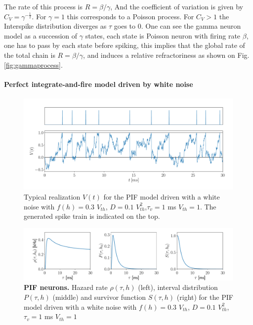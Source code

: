 \documentclass[12pt,twoside]{report}
\begin{document}
The rate of this process is $R=\beta/\gamma$, And the coefficient of variation is given by $C_V=\gamma^{-\frac{1}{2}}$. For $\gamma=1$ this corresponds to a Poisson process. For $C_V>1$ the Interspike distribution diverges as $\tau$ goes to $0$.  One can see the gamma  neuron model as a succession of $\gamma$ states, each state is Poisson neuron with firing rate $\beta$, one has to pass by each state before spiking, this implies that the global rate of the total chain is $R=\beta/\gamma$, and induces a relative refractoriness as shown on Fig.\ref{fig:gammaprocess}.


\paragraph{Perfect integrate-and-fire model driven by white noise}
\label{sec:pif}

\begin{figure}[h!]
	\centering
	\includegraphics[width=0.8\linewidth]{PIF_V}
	\caption{Typical realization $V(t)$ for the PIF model driven with a white noise with $f(h)=0.3$ $V_{th}$, $D=0.1$ $V_{th}^2$,$\tau_v=1$ ms $V_{th}=1$. The generated spike train is indicated on the top.
	}
	\label{fig:PIFV}
\end{figure}


\begin{figure}[h!]
	
	\includegraphics[width=\linewidth]{inversegaussian.pdf}
	\caption{\textbf{PIF neurons.} Hazard rate $\rho(\tau,h)$ (left), interval distribution $P(\tau,h)$ (middle) and survivor function $S(\tau,h)$ (right) for the PIF model driven with a white noise with $f(h)=0.3$ $V_{th}$, $D=0.1$ $V_{th}^2$,$\tau_v=1$ ms $V_{th}=1$
	}
	\label{fig:inversegaussianprocess}
\end{figure}
\end{document}

